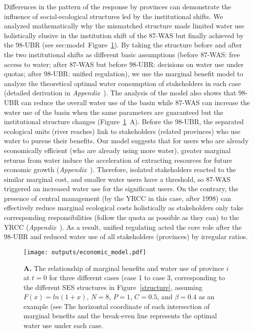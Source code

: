 \label{discussion-2}
Differences in the pattern of the response by provinces can demonstrate the influence of social-ecological structures led by the institutional shifts.
We analyzed mathematically why the mismatched structure made limited water use holistically elusive in the institution shift of the 87-WAS but finally achieved by the 98-UBR (see \refname{sec:model}~Figure~\ref{fig:model}).
By taking the structure before and after the two institutional shifts as different basic assumptions (before 87-WAS: free access to water; after 87-WAS but before 98-UBR: decisions on water use under quotas; after 98-UBR: unified regulation), we use the marginal benefit model to analyze the theoretical optimal water consumption of stakeholders in each case (detailed derivation in \textit{Appendix~}).
The analysis of the model also shows that 98-UBR can reduce the overall water use of the basin while 87-WAS can increase the water use of the basin when the same parameters are guaranteed but the institutional structure changes (Figure~\ref{fig:model}~A).
Before the 98-UBR, the separated ecological units (river reaches) link to stakeholders (related provinces) who use water to pursue their benefits.
Our model suggests that for users who are already economically efficient (who are already using more water), greater marginal returns from water induce the acceleration of extracting resources for future economic growth (\textit{Appendix~}).
Therefore, isolated stakeholders reacted to the similar marginal cost, and smaller water users have a threshold, so 87-WAS triggered an increased water use for the significant users.
On the contrary, the presence of central management (by the YRCC in this case, after 1998) can effectively reduce marginal ecological costs holistically as stakeholders only take corresponding responsibilities (follow the quota as possible as they can) to the YRCC (\textit{Appendix~}).
As a result, unified regulating acted the core role after the 98-UBR and reduced water use of all stakeholders (provinces) by irregular ratios.

\begin{figure}[!ht]
    \centering
    \texttt{[image: outputs/economic\_model.pdf]}
	\caption{
		\textbf{A.} The relationship of marginal benefits and water use of province $i$ at $t = 0$ for three different cases (case 1 to case 3, corresponding to the different SES structures in Figure~\ref{structure}, assuming $F(x)=ln(1+x)$, $N=8$, $P=1$, $C=0.5$, and $\beta=0.4$ as an example (see \textit{} The horizontal coordinate of each intersection of marginal benefits and the break-even line represents the optimal water use under each case.}
	\label{fig:model}
\end{figure}

